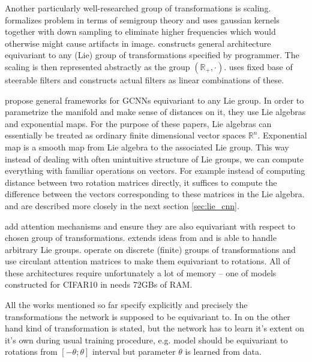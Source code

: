     Another particularly well-researched group of transformations is scaling.
    \cite{deep_scale_spaces} formalizes problem in terms of semigroup theory and
    uses gaussian kernels together with down sampling to eliminate higher
    frequencies which would otherwise might cause artifacts in image.
    \cite{bekkers2019} constructs general architecture equivariant to any (Lie) group
    of transformations specified by programmer. The scaling is then represented abstractly as
    the group $\left(\mathbb{R}_+,\cdot\right)$. \cite{scale_steerable} uses
    fixed base of steerable filters and constructs actual filters as linear
    combinations of these.


    \cite{bekkers2019, lieconv, lie_transformer} propose general frameworks for
    GCNNs equivariant to any Lie group. In order to parametrize the manifold and
    make sense of distances on it, they use Lie algebras and exponential maps.
    For the purpose of these papers, Lie algebras can essentially be treated as
    ordinary finite dimensional vector spaces $\mathbb{R}^n$. Exponential map
    is a smooth map from Lie algebra to the associated Lie group. This way
    instead of dealing with often unintuitive structure of Lie groups, we can
    compute everything with familiar operations on vectors. For example
    instead of computing distance between two rotation matrices directly, it
    suffices to compute the difference between the vectors corresponding to
    these matrices in the Lie algebra. \cite{lieconv} and \cite{bekkers2019} are
    described more closely in the next section \ref{sec:lie_cnn}.

    \cite{lie_transformer, attentive_gcnn, coattentive} add attention mechanisms
    and ensure they are also equivariant with respect to chosen group of
    transformations. \cite{lie_transformer} extends ideas from \cite{lieconv}
    and is able to handle arbitrary Lie groups.
    \cite{attentive_gcnn, coattentive} operate on discrete (finite) groups of
    transformations and use circulant attention matrices to make them
    equivariant to rotations. All of these architectures require unfortunately a
    lot of memory -- one of models constructed for CIFAR10 in
    \cite{attentive_gcnn} needs 72GBs of RAM.

    All the works mentioned so far specify explicitly and precisely the
    transformations the network is supposed to be equivariant to. In
    \cite{augerino} on the other hand kind of transformation is stated, but the
    network has to learn it's extent on it's own during usual training
    procedure, e.g. model should be equivariant to rotations from
    $\left[-\theta;\theta\right]$ interval but parameter $\theta$ is learned from
    data.



